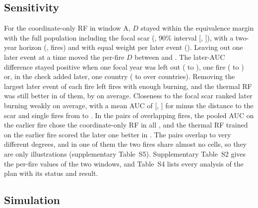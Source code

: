 \documentclass[preprint,12pt,authoryear]{elsarticle}
\begin{document}
\subsection{Sensitivity}
\label{sec:res-sens}

For the coordinate-only RF in window A, $D$ stayed within the equivalence margin with the full population including the focal scar (\sADFull, 90\% interval [\sADFullLo, \sADFullHi]), with a two-year horizon (\sADTwoYear, \sATwoYearFires{} fires) and with equal weight per later event (\sADEvent). Leaving out one later event at a time moved the per-fire $D$ between \sALoeoMin{} and \sALoeoMax. The later-AUC difference stayed positive when one focal year was left out (\sALoyoMin{} to \sALoyoMax), one fire (\sALofoMin{} to \sALofoMax) or, in the check added later, one country (\sALocoMin{} to \sALocoMax{} over \sACountries{} countries). Removing the largest later event of each fire left \sANoLargestFires{} fires with enough burning, and the thermal RF was still better in \sANoLargestBetter{} of them, by \sANoLargest{} on average. Closeness to the focal scar ranked later burning weakly on average, with a mean AUC of \sAScar{} [\sAScarLo, \sAScarHi] for minus the distance to the scar and single fires from \sAScarMin{} to \sAScarMax. In the \sRpN{} pairs of overlapping fires, the pooled AUC on the earlier fire chose the coordinate-only RF in all \sRpCoordChosen, and the thermal RF trained on the earlier fire scored the later one better in \sRpThermBetter. The pairs overlap to very different degrees, and in one of them the two fires share almost no cells, so they are only illustrations (supplementary Table~S5). Supplementary Table~S2 gives the per-fire values of the two windows, and Table~S4 lists every analysis of the plan with its status and result.

\subsection{Simulation}
\label{sec:res-sim}
\end{document}
